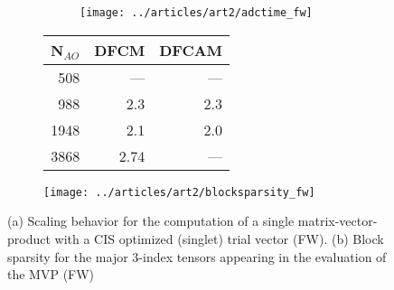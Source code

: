\begin{figure}

\begin{subfigure}{\textwidth}
\begin{subfigure}{0.45\textwidth}
\centering
\texttt{[image: ../articles/art2/adctime\_fw]}
\end{subfigure}
\hfill
\begin{subtable}{0.45\textwidth}
\centering
\begin{tabular}{rrr}
\hline
N$_{AO}$ & DFCM & DFCAM \\ \hline
508	& ---	& --- \\
988	& 2.3	& 2.3 \\
1948 & 	2.1 &	2.0 \\
3868	 & 2.74 & --- \\
 \hline
\end{tabular}
\end{subtable}
\caption{}
\label{fig:ES_TIME_FW}
\end{subfigure}

\vspace{1.5\baselineskip}

\centering
\begin{subfigure}{0.45\textwidth}
\centering
\texttt{[image: ../articles/art2/blocksparsity\_fw]}
\caption{}
\label{fig:ES_SPARSITY_FW}
\end{subfigure}

\caption{(a) Scaling behavior for the computation of a single matrix-vector-product with a CIS optimized (singlet) trial vector (FW). (b) Block sparsity for the major 3-index tensors appearing in the evaluation of the MVP (FW)}

\end{figure}